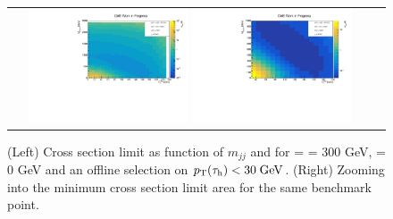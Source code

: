 \begin{figure}[tbh!]
	\centering
	\begin{tabular}{cc}
		\includegraphics[width=0.45\textwidth]{analysis/pics/JetInvMass_vs_MET_xsec_chi300_lsp000_taupt30.pdf}
		\includegraphics[width=0.45\textwidth]{analysis/pics/JetInvMass_vs_MET_xsec_chi300_lsp000_taupt30_zoom.pdf}
	\end{tabular}
	\caption{(Left) Cross section limit as function of $m_{jj}$ and \met for \charginopm = \neutralinotwo = 300 GeV, \neutralinoone = 0 GeV and an offline selection on $p_{\text{T}}(\tau_{\text{h}}) <  30\;\text{Ge}\kern-0.06667em\text{V}$. (Right) Zooming into the minimum cross section limit area for the same benchmark point.}
	\label{fig::JetInvMass_vs_MET_xsec_chi300_lsp000_taupt30}
\end{figure}

